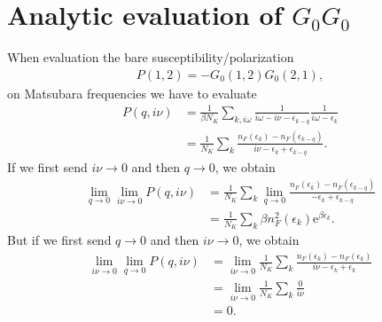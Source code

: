 \documentclass[12pt,a4paper]{scrartcl}
\numberwithin{equation}{section}
\begin{document}
\section{Analytic evaluation of $G_0G_0$}
\label{sec:analytic_g0g0}
When evaluation the bare susceptibility/polarization
\begin{align}
 P(1,2) = -G_0(1,2)G_0(2,1),
\end{align}
on Matsubara frequencies we have to evaluate
\begin{align}
 P(q,i\nu)
 &= \frac{1}{\beta N_K}\sum_{k,i\omega} \frac{1}{i\omega-i\nu - \epsilon_{k-q}}\frac{1}{i\omega - \epsilon_k } \\
 &= \frac{1}{N_K}\sum_k \frac{n_F(\epsilon_k)-n_F(\epsilon_{k-q})}{ i\nu - \epsilon_k+ \epsilon_{k-q} }.
\end{align}
If we first send $i\nu\rightarrow 0$ and then $q\rightarrow 0$, we obtain
\begin{align}
 \lim_{q\rightarrow 0}\lim_{i\nu\rightarrow 0}P(q,i\nu)
 &=\frac{1}{N_K}\sum_k  \lim_{q\rightarrow 0} \frac{n_F(\epsilon_k)-n_F(\epsilon_{k-q})}{  - \epsilon_k+ \epsilon_{k-q} }\\
 &=\frac{1}{N_K}\sum_k  \beta n^2_F(\epsilon_k)\mathrm{e}^{\beta \epsilon_k}.
\end{align}
But if we first send $q\rightarrow 0$ and then $i\nu\rightarrow 0$, we obtain
\begin{align}
 \lim_{i\nu\rightarrow 0} \lim_{q\rightarrow 0}P(q,i\nu)
 &=\lim_{i\nu\rightarrow 0} \frac{1}{N_K}\sum_k \frac{n_F(\epsilon_k)-n_F(\epsilon_{k})}{i\nu  - \epsilon_k+ \epsilon_{k} }\\
 &=\lim_{i\nu\rightarrow 0} \frac{1}{N_K}\sum_k \frac{0}{i\nu} \\
 &= 0.
\end{align}
\end{document}
